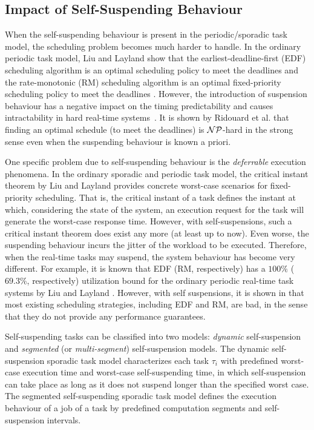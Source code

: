 \subsection{Impact of Self-Suspending Behaviour}

When the self-suspending behaviour is present in the periodic/sporadic task model, the scheduling problem becomes much harder to handle. In the ordinary periodic task model, Liu and Layland show that the earliest-deadline-first (EDF) scheduling algorithm is an optimal scheduling policy to meet the deadlines and the rate-monotonic (RM) scheduling algorithm is an optimal fixed-priority scheduling policy to meet the deadlines \cite{Liu_1973}. However, the introduction of suspension behaviour has a negative impact on the timing predictability and causes intractability in hard real-time systems~\cite{Ridouard_2004}. It is shown by Ridouard et al. \cite{Ridouard_2004} that finding an optimal schedule (to meet the deadlines) is ${\cal NP}$-hard in the strong sense even when the suspending behaviour is known a priori.


One specific problem due to self-suspending behaviour is the \emph{deferrable} execution phenomena. In the ordinary sporadic and periodic task model, the critical instant theorem by Liu and Layland \cite{Liu_1973} provides concrete worst-case scenarios for fixed-priority scheduling.  That is, the critical instant of a task defines the instant at which, considering the state of the system, an execution request for the task will generate the worst-case response time.
However, with self-suspensions, such a critical instant theorem does exist any more (at least up to now). Even worse, the suspending behaviour incurs the jitter of the workload to be executed. Therefore, when the real-time tasks may suspend, the system behaviour has become very different. For example, it is known that EDF (RM, respectively) has a $100\%$ ($69.3\%$, respectively) utilization bound for the ordinary periodic real-time task systems by Liu and Layland \cite{Liu_1973}. However, with self suspensions,  it is shown in \cite{Ridouard_2004,RTSS-ChenL14} that most existing scheduling strategies, including EDF and RM, are bad, in the sense that they do not provide any performance guarantees. 

Self-suspending tasks can be classified into two models: \emph{dynamic} self-suspension and \emph{segmented} (or \emph{multi-segment}) self-suspension models.
The dynamic self-suspension sporadic task model characterizes each
task $\tau_i$ with predefined worst-case execution time and worst-case self-suspending time, in which self-suspension can take place as long as it does not suspend longer than the specified worst case. The segmented self-suspending sporadic task model defines the execution behaviour of a job of a task by predefined computation segments and self-suspension intervals.  

